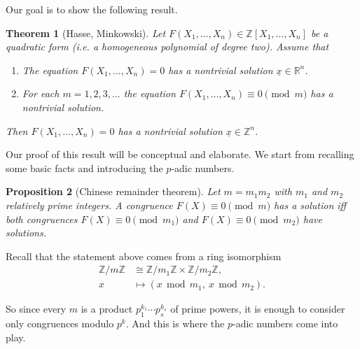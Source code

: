 \documentclass{article}
\newcommand{\isom}{\cong}
\newcommand{\ZZ}{\mathbb{Z}}
\renewcommand{\mod}{\mathop{\,\mathrm{mod}\,}}
\theoremstyle{myplain}
\newtheorem{proposition}{Proposition}[section]
\newtheorem{theorem}[proposition]{Theorem}
\theoremstyle{mydefinition}
\begin{document}
Our goal is to show the following result.

\begin{theorem}[Hasse, Minkowski]\label{theorem:Hasse-Minkowski-1}
  Let $F (X_1,\ldots,X_n) \in \ZZ [X_1,\ldots,X_n]$ be a quadratic form
  (i.e. a homogeneous polynomial of degree two). Assume that
  \begin{enumerate}
  \item The equation $F (X_1,\ldots,X_n) = 0$ has a nontrivial solution
    $\underline{x} \in \mathbb{R}^n$.

  \item For each $m = 1, 2, 3, \ldots$ the equation
    $F (X_1,\ldots,X_n) \equiv 0 \pmod{m}$ has a nontrivial solution.
  \end{enumerate}

  Then $F (X_1,\ldots,X_n) = 0$ has a nontrivial solution
  $\underline{x} \in \ZZ^n$.
\end{theorem}

Our proof of this result will be conceptual and elaborate. We start from
recalling some basic facts and introducing the $p$-adic numbers.

\begin{proposition}[Chinese remainder theorem]
  Let $m = m_1 m_2$ with $m_1$ and $m_2$ relatively prime integers. A congruence
  $F (X) \equiv 0 \pmod{m}$ has a solution iff both congruences
  $F (X) \equiv 0 \pmod{m_1}$ and $F (X) \equiv 0 \pmod{m_2}$ have solutions.
\end{proposition}

Recall that the statement above comes from a ring isomorphism
\begin{align*}
  \ZZ/m\ZZ & \isom \ZZ/m_1\ZZ \times \ZZ/m_2\ZZ,\\
  x & \mapsto (x \mod m_1, ~ x \mod m_2).
\end{align*}

So since every $m$ is a product $p_1^{k_1}\cdots p_s^{k_s}$ of prime powers, it
is enough to consider only congruences modulo $p^k$. And this is where the
$p$-adic numbers come into play.
\end{document}
